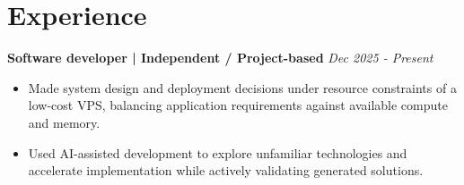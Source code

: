 \section{Experience}

\textbf{ Software developer | Independent / Project-based } \hfill \textit{Dec 2025 - Present}

\begin{itemize}
    \item Made system design and deployment decisions under resource constraints of a low-cost VPS, balancing application requirements against available compute and memory.
    \item Used AI-assisted development to explore unfamiliar technologies and accelerate implementation while actively validating generated solutions.
\end{itemize}